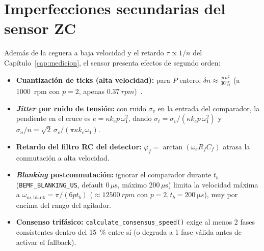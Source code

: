\documentclass[11pt,a4paper,oneside]{report}
\theoremstyle{definition}
\theoremstyle{remark}
\begin{document}
\section{Imperfecciones secundarias del sensor ZC}\label{ap:sensor_extendido}
Además de la ceguera a baja velocidad y el retardo $\tau\propto 1/n$ del
Capítulo~\ref{cap:medicion}, el sensor presenta efectos de segundo orden:
\begin{itemize}
  \item \textbf{Cuantización de ticks (alta velocidad):} para $P$ entero,
        $\delta n \approx \frac{p\,n^2}{30\,f_t}$ (a \SI{1000}{rpm} con $p=2$,
        apenas $\SI{0,37}{rpm}$)~\cite{ohmae1982}.
  \item \textbf{\emph{Jitter} por ruido de tensión:} con ruido $\sigma_v$ en
        la entrada del comparador, la pendiente en el cruce es
        $\dot e = \kappa k_e p\,\omega_1^2$, dando $\sigma_t = \sigma_v/(\kappa k_e p\,\omega_1^2)$
        y $\sigma_n/n = \sqrt2\,\sigma_v/(\pi\kappa k_e\omega_1)$.
  \item \textbf{Retardo del filtro RC del detector:}
        $\varphi_f = \arctan(\omega_e R_f C_f)$ atrasa la conmutación a alta
        velocidad.
  \item \textbf{\emph{Blanking} postconmutación:} ignorar el comparador durante
        $t_b$ (\texttt{BEMF\_BLANKING\_US}, default $0\,\mu\text{s}$, máximo
        $200\,\mu\text{s}$) limita la velocidad máxima a
        $\omega_{m,\text{blank}} = \pi/(6 p t_b)$ ($\approx \SI{12500}{rpm}$ con
        $p=2, t_b=\SI{200}{\micro s}$), muy por encima del rango del agitador.
  \item \textbf{Consenso trifásico:} \texttt{calculate\_consensus\_speed()}
        exige al menos 2 fases consistentes dentro del \SI{15}{\percent} entre sí
        (o degrada a 1 fase válida antes de activar el fallback).
\end{itemize}
\end{document}
